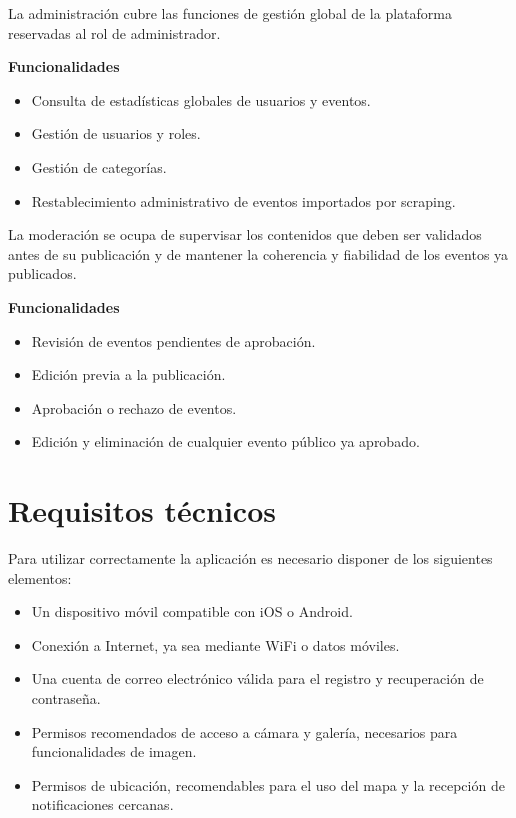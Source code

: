 \begin{tcolorbox}[title=\textbf{Administración}]
La administración cubre las funciones de gestión global de la plataforma reservadas al rol de administrador.

\vspace{0.4em}
\textbf{Funcionalidades}
\begin{itemize}[leftmargin=1.5em]
\item Consulta de estadísticas globales de usuarios y eventos.
\item Gestión de usuarios y roles.
\item Gestión de categorías.
\item Restablecimiento administrativo de eventos importados por scraping.
\end{itemize}
\end{tcolorbox}

\begin{tcolorbox}[title=\textbf{Moderación}]
La moderación se ocupa de supervisar los contenidos que deben ser validados antes de su publicación y de mantener la coherencia y fiabilidad de los eventos ya publicados.

\vspace{0.4em}
\textbf{Funcionalidades}
\begin{itemize}[leftmargin=1.5em]
\item Revisión de eventos pendientes de aprobación.
\item Edición previa a la publicación.
\item Aprobación o rechazo de eventos.
\item Edición y eliminación de cualquier evento público ya aprobado.
\end{itemize}
\end{tcolorbox}

\section{Requisitos técnicos}

Para utilizar correctamente la aplicación es necesario disponer de los siguientes elementos:

\begin{itemize}[leftmargin=1.5em]
\item Un dispositivo móvil compatible con iOS o Android.
\item Conexión a Internet, ya sea mediante WiFi o datos móviles.
\item Una cuenta de correo electrónico válida para el registro y recuperación de contraseña.
\item Permisos recomendados de acceso a cámara y galería, necesarios para funcionalidades de imagen.
\item Permisos de ubicación, recomendables para el uso del mapa y la recepción de notificaciones cercanas.
\end{itemize}

